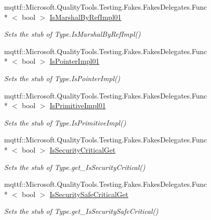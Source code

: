 \begin{DoxyCompactItemize}
mqttf\-::\-Microsoft.\-Quality\-Tools.\-Testing.\-Fakes.\-Fakes\-Delegates.\-Func\\*
$<$ bool $>$ \hyperlink{class_system_1_1_fakes_1_1_stub_type_a4f943f3aad45bdfcde1990f9328c242a}{Is\-Marshal\-By\-Ref\-Impl01}
\begin{DoxyCompactList}\small\item\em Sets the stub of Type.\-Is\-Marshal\-By\-Ref\-Impl()\end{DoxyCompactList}\item 
mqttf\-::\-Microsoft.\-Quality\-Tools.\-Testing.\-Fakes.\-Fakes\-Delegates.\-Func\\*
$<$ bool $>$ \hyperlink{class_system_1_1_fakes_1_1_stub_type_a8ad9ba6ba484b149409b5467b6b3a871}{Is\-Pointer\-Impl01}
\begin{DoxyCompactList}\small\item\em Sets the stub of Type.\-Is\-Pointer\-Impl()\end{DoxyCompactList}\item 
mqttf\-::\-Microsoft.\-Quality\-Tools.\-Testing.\-Fakes.\-Fakes\-Delegates.\-Func\\*
$<$ bool $>$ \hyperlink{class_system_1_1_fakes_1_1_stub_type_ad0e97888ae27234b9f27c85be2345157}{Is\-Primitive\-Impl01}
\begin{DoxyCompactList}\small\item\em Sets the stub of Type.\-Is\-Primitive\-Impl()\end{DoxyCompactList}\item 
mqttf\-::\-Microsoft.\-Quality\-Tools.\-Testing.\-Fakes.\-Fakes\-Delegates.\-Func\\*
$<$ bool $>$ \hyperlink{class_system_1_1_fakes_1_1_stub_type_a71c8ce2b830bc88542835ef697e84efb}{Is\-Security\-Critical\-Get}
\begin{DoxyCompactList}\small\item\em Sets the stub of Type.\-get\-\_\-\-Is\-Security\-Critical()\end{DoxyCompactList}\item 
mqttf\-::\-Microsoft.\-Quality\-Tools.\-Testing.\-Fakes.\-Fakes\-Delegates.\-Func\\*
$<$ bool $>$ \hyperlink{class_system_1_1_fakes_1_1_stub_type_a09fe9c50e1a21a8eb8120e1b9b96c987}{Is\-Security\-Safe\-Critical\-Get}
\begin{DoxyCompactList}\small\item\em Sets the stub of Type.\-get\-\_\-\-Is\-Security\-Safe\-Critical()\end{DoxyCompactList}\item 

\end{DoxyCompactItemize}

